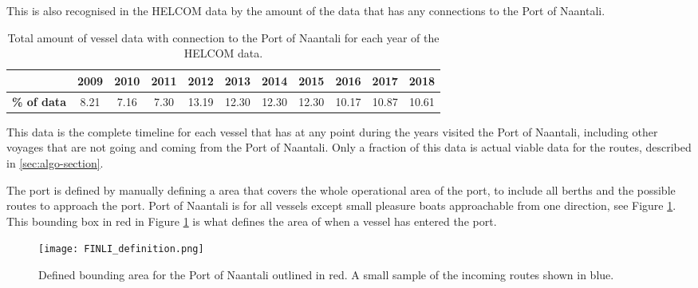 \documentclass[../main.tex]{subfiles}
\begin{document}
This is also recognised in the HELCOM data by the amount of the data that has any connections to the Port of Naantali.

\begin{table}[H]
\centering
\begin{tabular}{|l|c|c|c|c|c|c|c|c|c|c|}
\hline
\rowcolor[HTML]{C0C0C0} 
\multicolumn{1}{|r|}{\cellcolor[HTML]{C0C0C0}\textbf{Year}} & \textbf{2009} & \textbf{2010} & \textbf{2011} & \textbf{2012} & \textbf{2013} & \textbf{2014} & \textbf{2015} & \textbf{2016} & \textbf{2017} & \textbf{2018} \\ \hline
\textbf{\% of data}                           & 8.21          & 7.16          & 7.30          & 13.19         & 12.30         & 12.30         & 12.30         & 10.17         & 10.87         & 10.61         \\ \hline
\end{tabular}
\caption{Total amount of vessel data with connection to the Port of Naantali for each year of the HELCOM data.}
\label{tab:HELCOM-data-percent}
\end{table}

This data is the complete timeline for each vessel that has at any point during the years visited the Port of Naantali, including other voyages that are not going and coming from the Port of Naantali. Only a fraction of this data is actual viable data for the routes, described in \ref{sec:algo-section}.

The port is defined by manually defining a area that covers the whole operational area of the port, to include all berths and the possible routes to approach the port. Port of Naantali is for all vessels except small pleasure boats approachable from one direction, see Figure \ref{fig:FINLI-box}. This bounding box in red in Figure \ref{fig:FINLI-box} is what defines the area of when a vessel has entered the port. 

\begin{figure}[H]
\centering
\texttt{[image: FINLI\_definition.png]}
\caption{Defined bounding area for the Port of Naantali outlined in red. A small sample of the incoming routes shown in blue.}
\label{fig:FINLI-box}
\end{figure}
\end{document}
